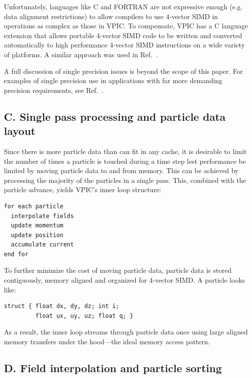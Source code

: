 \documentclass[aps,prl,preprint,preprintnumbers,groupedaddress]{revtex4}
\begin{document}
Unfortunately, languages like C and FORTRAN are not expressive enough
(e.g. data alignment restrictions) to allow compilers to use 4-vector
SIMD in operations as complex as those in VPIC.  To compensate, VPIC
has a C language extension that allows portable 4-vector SIMD code to
be written and converted automatically to high performance 4-vector
SIMD instructions on a wide variety of platforms.  A similar approach
was used in Ref.~\cite{Bowers_et_al_2006}.

A full discussion of single precision issues is beyond the scope of
this paper.  For examples of single precision use in applications with
far more demanding precision requirements, see
Ref.~\cite{Bowers_et_al_2006,Lippert_et_al_2007}.

\subsection{C. Single pass processing and particle data layout}

Since there is more particle data than can fit in any cache, it is
desirable to limit the number of times a particle is touched during a
time step lest performance be limited by moving particle data to and
from memory.  This can be achieved by processing the majority of the
particles in a single pass.  This, combined with the particle advance,
yields VPIC's inner loop structure:
\begin{verbatim}
for each particle
  interpolate fields
  update momentum
  update position
  accumulate current
end for
\end{verbatim}

To further minimize the cost of moving particle data, particle data is
stored contiguously, memory aligned and organized for 4-vector SIMD.
A particle looks like:
\begin{verbatim}
struct { float dx, dy, dz; int i;
         float ux, uy, uz; float q; }
\end{verbatim}
As a result, the inner loop streams through particle data once using
large aligned memory transfers under the hood---the ideal memory
access pattern.

\subsection{D. Field interpolation and particle sorting}
\end{document}
